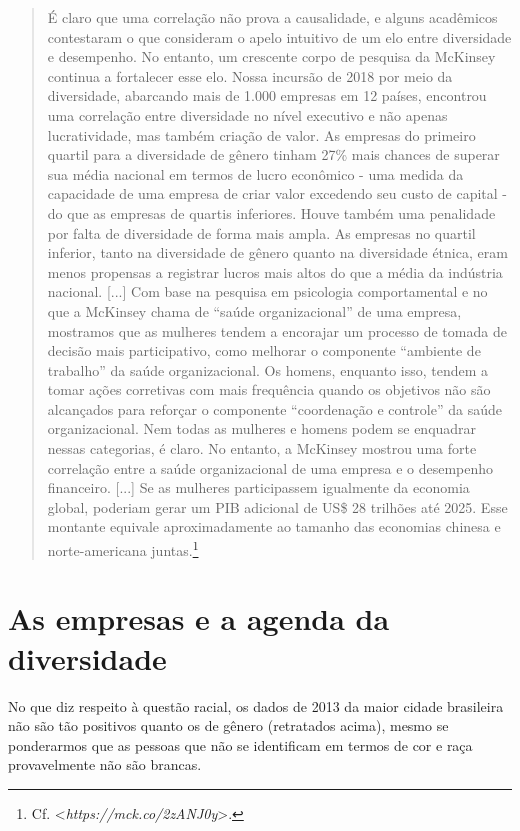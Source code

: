 \begin{quote}
É claro que uma correlação não prova a causalidade, e alguns acadêmicos
contestaram o que consideram o apelo intuitivo de um elo entre
diversidade e desempenho. No entanto, um crescente corpo de pesquisa da
McKinsey continua a fortalecer esse elo. Nossa incursão de 2018 por meio
da diversidade, abarcando mais de 1.000 empresas em 12 países, encontrou
uma correlação entre diversidade no nível executivo e não apenas
lucratividade, mas também criação de valor. As empresas do primeiro
quartil para a diversidade de gênero tinham 27\% mais chances de superar
sua média nacional em termos de lucro econômico - uma medida da
capacidade de uma empresa de criar valor excedendo seu custo de capital
- do que as empresas de quartis inferiores. Houve também uma penalidade
por falta de diversidade de forma mais ampla. As empresas no quartil
inferior, tanto na diversidade de gênero quanto na diversidade étnica,
eram menos propensas a registrar lucros mais altos do que a média da
indústria nacional. {[}...{]} Com base na pesquisa em psicologia
comportamental e no que a McKinsey chama de ``saúde organizacional'' de
uma empresa, mostramos que as mulheres tendem a encorajar um processo de
tomada de decisão mais participativo, como melhorar o componente
``ambiente de trabalho'' da saúde organizacional. Os homens, enquanto
isso, tendem a tomar ações corretivas com mais frequência quando os
objetivos não são alcançados para reforçar o componente ``coordenação e
controle'' da saúde organizacional. Nem todas as mulheres e homens podem
se enquadrar nessas categorias, é claro. No entanto, a McKinsey mostrou
uma forte correlação entre a saúde organizacional de uma empresa e o
desempenho financeiro. {[}...{]} Se as mulheres participassem igualmente
da economia global, poderiam gerar um PIB adicional de US\$ 28 trilhões
até 2025. Esse montante equivale aproximadamente ao tamanho das
economias chinesa e norte-americana juntas.\footnote{Cf.
  \textless{}\emph{https://mck.co/2zANJ0y}\textgreater{}.}
\end{quote}

\chapter{As empresas e a agenda da diversidade}

No que diz respeito à questão racial, os dados de 2013 da maior cidade
brasileira não são tão positivos quanto os de gênero (retratados acima),
mesmo se ponderarmos que as pessoas que não se identificam em termos de
cor e raça provavelmente não são brancas.

